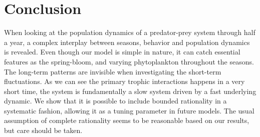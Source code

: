 
\section*{Conclusion} %
When looking at the population dynamics of a predator-prey system through half a year, a complex interplay between seasons, behavior and population dynamics is revealed. Even though our model is simple in nature, it can catch essential features as the spring-bloom, and varying phytoplankton throughout the seasons.  The long-term patterns are invisible when investigating the short-term fluctuations. As we can see the primary trophic interactions happens in a very short time, the system is fundamentally a slow system driven by a fast underlying dynamic.
We show that it is possible to include bounded rationality in a systematic fashion, allowing it as a tuning parameter in future models. The usual assumption of complete rationality seems to be reasonable based on our results, but care should be taken.


